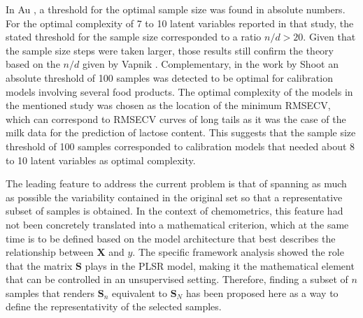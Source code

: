 \documentclass[journal=ancham,manuscript=article]{achemso}
\begin{document}
In Au \cite{Au2020}, a threshold for the optimal sample size was found in absolute numbers. For the optimal complexity of 7 to 10 latent variables reported in that study, the stated threshold for the sample size corresponded to a ratio $n/d > 20$. Given that the sample size steps were taken larger, those results still confirm the theory based on the $n/d$ given by Vapnik \cite{Vapnik2000}. Complementary, in the work by Shoot \cite{Schoot2020} an absolute threshold of 100 samples was detected to be optimal for calibration models involving several food products. The optimal complexity of the models in the mentioned study was chosen as the location of the minimum RMSECV, which can correspond to RMSECV curves of long tails as it was the case of the milk data for the prediction of lactose content. This suggests that the sample size threshold of 100 samples corresponded to calibration models that needed about 8 to 10 latent variables as optimal complexity.  

The leading feature to address the current problem is that of spanning as much as possible the variability contained in the original set so that a representative subset of samples is obtained. In the context of chemometrics, this feature had not been concretely translated into a mathematical criterion, which at the same time is to be defined based on the model architecture that best describes the relationship between $\mathbf{X}$ and $y$. The specific framework analysis showed the role that the matrix $\mathbf{S}$ plays in the PLSR model, making it the mathematical element that can be controlled in an unsupervised setting. Therefore, finding a subset of $n$ samples that renders $\mathbf{S}_n$ equivalent to $\mathbf{S}_N$ has been proposed here as a way to define the representativity of the selected samples. 
\end{document}
